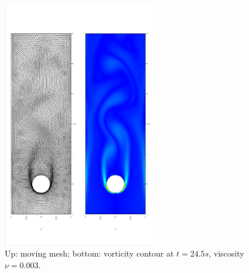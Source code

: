 \documentclass[a4paper, 11pt]{article}
\begin{document}


    \begin{figure}[!htbp]
      \begin{center}
        \includegraphics[width = 0.6\textwidth, angle = -90]{picture/obstacle_flow_data/mesh_t_24_5s.eps}
      \end{center}  
      \caption{\small Up: moving mesh; bottom: vorticity contour at
        $t = 24.5s$, viscosity $\nu = 0.003$.}
      \label{fig::cylinder_mesh_t24_5s}
    \end{figure}
\end{document}
